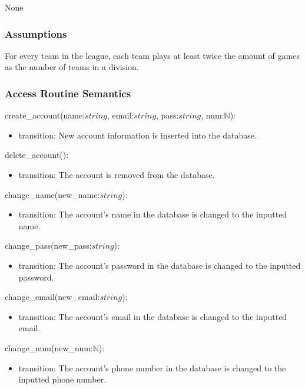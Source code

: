 \documentclass[12pt, titlepage]{article}
\begin{document}
None

\subsubsection{Assumptions}

For every team in the league, each team plays at least twice the amount of games
as the number of teams in a division.



\subsubsection{Access Routine Semantics}

\noindent create\_account(name:$string$, email:$string$, pass:$string$, num:$\mathbb{N}$):
\begin{itemize}
\item transition: New account information is inserted into the database.
\end{itemize}

\noindent delete\_account():
\begin{itemize}
\item transition: The account is removed from the database.
\end{itemize}

\noindent change\_name(new\_name:$string$):
\begin{itemize}
\item transition: The account's name in the database is changed to the inputted
name.
\end{itemize}

\noindent change\_pass(new\_pass:$string$):
\begin{itemize}
\item transition: The account's password in the database is changed to the
inputted password.
\end{itemize}

\noindent change\_email(new\_email:$string$):
\begin{itemize}
\item transition: The account's email in the database is changed to the
inputted email.
\end{itemize}

\noindent change\_num(new\_num:$\mathbb{N}$):
\begin{itemize}
\item transition: The account's phone number in the database is changed to the
inputted phone number.
\end{itemize}
\end{document}
